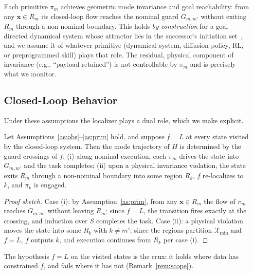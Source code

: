 \begin{assumption}
\label{as:prim}
Each primitive $\pi_m$ achieves geometric mode invariance and goal reachability: from any $\mathbf{x}\in R_m$ its closed-loop flow reaches the nominal guard $G_{m,m'}$ without exiting $R_m$ through a non-nominal boundary. This holds \emph{by construction} for a goal-directed dynamical system whose attractor lies in the successor's initiation set~\cite{burridge1999sequential}, and we assume it of whatever primitive (dynamical system, diffusion policy, RL, or preprogrammed skill) plays that role. The residual, physical component of invariance (e.g., ``payload retained'') is not controllable by $\pi_m$ and is precisely what we monitor.
\end{assumption}

\subsection{Closed-Loop Behavior}
Under these assumptions the localizer plays a dual role, which we make explicit.

\begin{proposition}
\label{prop:main}
Let Assumptions~\ref{as:obs}--\ref{as:prim} hold, and suppose $f=L$ at every state visited by the closed-loop system. Then the mode trajectory of $H$ is determined by the guard crossings of $f$: (i) along nominal execution, each $\pi_m$ drives the state into $G_{m,m'}$ and the task completes; (ii) upon a physical invariance violation, the state exits $R_m$ through a non-nominal boundary into some region $R_k$, $f$ re-localizes to $k$, and $\pi_k$ is engaged.
\end{proposition}

\begin{proof}[Proof sketch]
Case (i): by Assumption~\ref{as:prim}, from any $\mathbf{x}\in R_m$ the flow of $\pi_m$ reaches $G_{m,m'}$ without leaving $R_m$; since $f=L$, the transition fires exactly at the crossing, and induction over $S$ completes the task. Case (ii): a physical violation moves the state into some $R_k$ with $k\neq m'$; since the regions partition $\mathcal{X}_{\min}$ and $f=L$, $f$ outputs $k$, and execution continues from $R_k$ per case (i).
\end{proof}

The hypothesis $f=L$ on the visited states is the crux: it holds where data has constrained $f$, and fails where it has not (Remark~\ref{rem:scope}).

